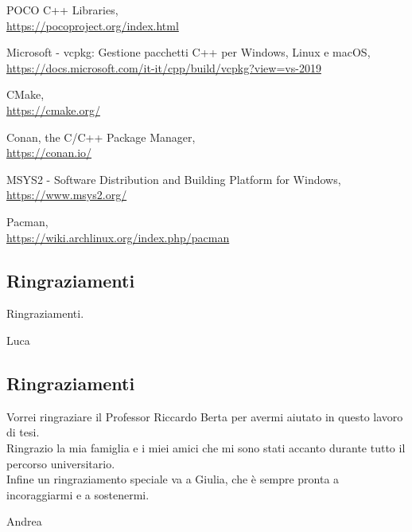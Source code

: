 \documentclass[a4paper,12pt,oneside]{book}
\begin{document}
\begin{thebibliography}{26}
\begin{spacing}{1.25}
	POCO C++ Libraries,
	\\\url{https://pocoproject.org/index.html}
	
	Microsoft - vcpkg: Gestione pacchetti C++ per Windows, Linux e macOS,
	\\\url{https://docs.microsoft.com/it-it/cpp/build/vcpkg?view=vs-2019}
	
	CMake,
	\\\url{https://cmake.org/}
	
	Conan, the C/C++ Package Manager,
	\\\url{https://conan.io/}
	
	MSYS2 - Software Distribution and Building Platform for Windows,
	\\\url{https://www.msys2.org/}
	
	Pacman,
	\\\url{https://wiki.archlinux.org/index.php/pacman}
	\end{spacing}
\end{thebibliography}
\newpage
\null{}
\begin{center}
	\section*{\centering Ringraziamenti}
		Ringraziamenti.
\end{center}

\begin{flushright}
	Luca
\end{flushright}
\null

\newpage
\null{}
\begin{center}
	\section*{\centering Ringraziamenti}
	Vorrei ringraziare il Professor Riccardo Berta per avermi aiutato in questo lavoro di tesi.\\
	Ringrazio la mia famiglia e i miei amici che mi sono stati accanto durante tutto il percorso universitario.\\
	Infine un ringraziamento speciale va a Giulia, che è sempre pronta a incoraggiarmi e a sostenermi.
\end{center}

\begin{flushright}
	Andrea
\end{flushright}
\null
\end{document}

